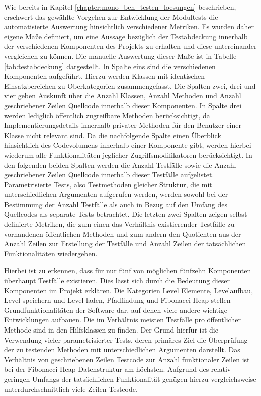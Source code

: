 Wie bereits in Kapitel \ref{chapter:mono_beh_testen_loesungen} beschrieben, erschwert das gewählte Vorgehen zur Entwicklung der Modultests die automatisierte Auswertung hinsichtlich verschiedener Metriken. Es wurden daher eigene Maße definiert, um eine Aussage bezüglich der Testabdeckung innerhalb der verschiedenen Komponenten des Projekts zu erhalten und diese untereinander vergleichen zu können. Die manuelle Auswertung dieser Maße ist in Tabelle \ref{tab:testabdeckung} dargestellt. In Spalte eins sind die verschiedenen Komponenten aufgeführt. Hierzu werden Klassen mit identischen Einsatzbereichen zu Oberkategorien zusammengefasst. Die Spalten zwei, drei und vier geben Auskunft über die Anzahl Klassen, Anzahl Methoden und Anzahl geschriebener Zeilen Quellcode innerhalb dieser Komponenten. In Spalte drei werden lediglich öffentlich zugreifbare Methoden berücksichtigt, da Implementierungsdetails innerhalb privater Methoden für den Benutzer einer Klasse nicht relevant sind. Da die nachfolgende Spalte einen Überblick hinsichtlich des Codevolumens innerhalb einer Komponente gibt, werden hierbei wiederum alle Funktionalitäten jeglicher Zugriffsmodifikatoren berücksichtigt. In den folgenden beiden Spalten werden die Anzahl Testfälle sowie die Anzahl geschriebener Zeilen Quellcode innerhalb dieser Testfälle aufgelistet. Parametrisierte Tests, also Testmethoden gleicher Struktur, die mit unterschiedlichen Argumenten aufgerufen werden, werden sowohl bei der Bestimmung der Anzahl Testfälle als auch in Bezug auf den Umfang des Quellcodes als separate Tests betrachtet. Die letzten zwei Spalten zeigen selbst definierte Metriken, die zum einen das Verhältnis existierender Testfälle zu vorhandenen öffentlichen Methoden und zum andern den Quotienten aus der Anzahl Zeilen zur Erstellung der Testfälle und Anzahl Zeilen der tatsächlichen Funktionalitäten wiedergeben. 

Hierbei ist zu erkennen, dass für nur fünf von möglichen fünfzehn Komponenten überhaupt Testfälle existieren. Dies lässt sich durch die Bedeutung dieser Komponenten im Projekt erklären. Die Kategorien Level Elemente, Levelaufbau, Level speichern und Level laden, Pfadfindung und Fibonacci-Heap stellen Grundfunktionalitäten der Software dar, auf denen viele andere wichtige Entwicklungen aufbauen. Die im Verhältnis meisten Testfälle pro öffentlicher Methode sind in den Hilfsklassen zu finden. Der Grund hierfür ist die Verwendung vieler parametrisierter Tests, deren primäres Ziel die Überprüfung der zu testenden Methoden mit unterschiedlichen Argumenten darstellt. Das Verhältnis von geschriebenen Zeilen Testcode zur Anzahl funktionaler Zeilen ist bei der Fibonacci-Heap Datenstruktur am höchsten. Aufgrund des relativ geringen Umfangs der tatsächlichen Funktionalität genügen hierzu vergleichsweise unterdurchschnittlich viele Zeilen Testcode. 






